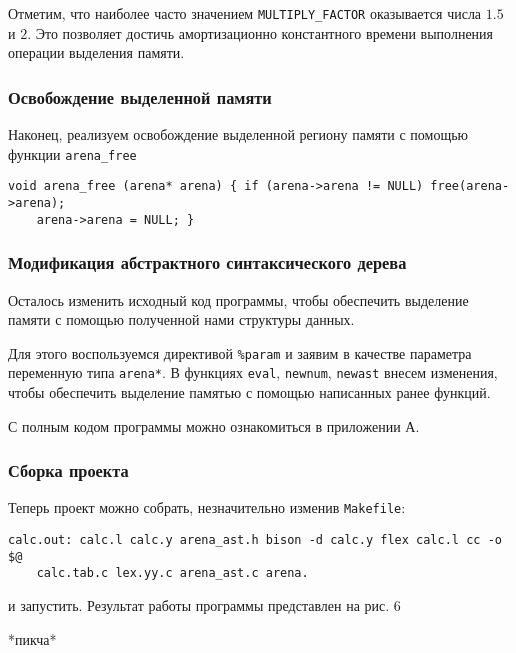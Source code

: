 \documentclass[bachelor, och, otchet]{SCWorks}
\begin{document}
Отметим, что наиболее часто значением \verb|MULTIPLY_FACTOR| оказывается числа
$1.5$ и $2$. Это позволяет достичь амортизационно константного времени
выполнения операции выделения памяти\cite{FacebookDoc}.

\subsubsection{Освобождение выделенной памяти}
Наконец, реализуем освобождение выделенной региону памяти с помощью функции
\verb|arena_free|

\begin{verbatim}
void arena_free (arena* arena) { if (arena->arena != NULL) free(arena->arena);
    arena->arena = NULL; }
\end{verbatim}

\subsubsection{Модификация абстрактного синтаксического дерева}
Осталось изменить исходный код программы, чтобы обеспечить выделение памяти с
помощью полученной нами структуры данных.

Для этого воспользуемся директивой \verb|%param| и заявим в качестве параметра
переменную типа \verb|arena*|. В функциях \verb|eval|, \verb|newnum|,
\verb|newast| внесем изменения, чтобы обеспечить выделение памятью с помощью
написанных ранее
функций.

С полным кодом программы можно ознакомиться в приложении А.

\subsubsection{Сборка проекта}
Теперь проект можно собрать, незначительно изменив \verb|Makefile|:

\begin{verbatim}
calc.out: calc.l calc.y arena_ast.h bison -d calc.y flex calc.l cc -o $@
    calc.tab.c lex.yy.c arena_ast.c arena.
\end{verbatim}
и запустить. Результат работы программы представлен на рис. 6

*пикча*
\end{document}
